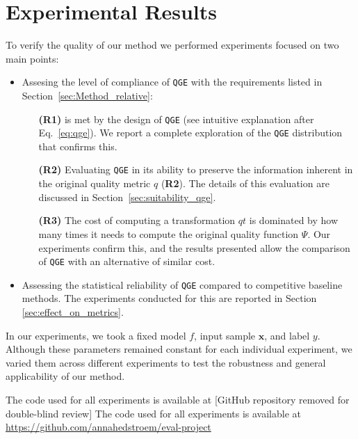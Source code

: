 \section{Experimental Results}\label{sec:experimental-results}
To verify the quality of our method we performed experiments focused on two main points:

\begin{itemize}
    \item Assesing the level of compliance of \texttt{QGE} with the requirements listed in Section~\ref{sec:Method_relative}:
    \begin{enumerate}
        \item[\textbf{(R1)}] is met by the design of \texttt{QGE} (see intuitive explanation after Eq.~{\ref{eq:qge}}). We report a complete exploration of the \texttt{QGE} distribution that confirms this.
        \item[\textbf{(R2)}] Evaluating \texttt{QGE} in its ability to preserve the information inherent in the original quality metric $q$ (\textbf{R2}). The details of this evaluation are discussed in Section~\ref{sec:suitability_qge}.
        \item[\textbf{(R3)}] The cost of computing a transformation $qt$ is dominated by how many times it needs to compute the original quality function $\Psi$. Our experiments confirm this, and the results presented allow the comparison of \texttt{QGE} with an alternative of similar cost. 
    \end{enumerate}

    \item Assessing the statistical reliability of \texttt{QGE} compared to competitive baseline methods. The experiments conducted for this are reported in Section \ref{sec:effect_on_metrics}. %
\end{itemize}

In our experiments, we took a fixed model $f$, input sample $\mathbf{x}$, and label $y$. Although these parameters remained constant for each individual experiment, we varied them across different experiments to test the robustness and general applicability of our method.

\ifdefined\doubleblind
  The code used for all experiments is available at [GitHub repository removed for double-blind review]
\else
  The code used for all experiments is available at \url{https://github.com/annahedstroem/eval-project}
\fi

